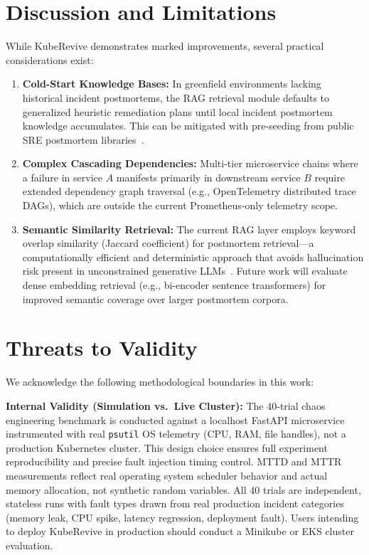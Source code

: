 \documentclass[conference]{IEEEtran}
\begin{document}
\section{Discussion and Limitations}
While KubeRevive demonstrates marked improvements, several practical considerations exist:
\begin{enumerate}
    \item \textbf{Cold-Start Knowledge Bases:} In greenfield environments lacking historical incident postmortems, the RAG retrieval module defaults to generalized heuristic remediation plans until local incident postmortem knowledge accumulates. This can be mitigated with pre-seeding from public SRE postmortem libraries~\cite{sre_google2016}.
    \item \textbf{Complex Cascading Dependencies:} Multi-tier microservice chains where a failure in service $A$ manifests primarily in downstream service $B$ require extended dependency graph traversal (e.g., OpenTelemetry distributed trace DAGs), which are outside the current Prometheus-only telemetry scope.
    \item \textbf{Semantic Similarity Retrieval:} The current RAG layer employs keyword overlap similarity (Jaccard coefficient) for postmortem retrieval---a computationally efficient and deterministic approach that avoids hallucination risk present in unconstrained generative LLMs~\cite{rcacopilot2024}. Future work will evaluate dense embedding retrieval (e.g., bi-encoder sentence transformers) for improved semantic coverage over larger postmortem corpora.
\end{enumerate}

\section{Threats to Validity}
We acknowledge the following methodological boundaries in this work:

\textbf{Internal Validity (Simulation vs.\ Live Cluster):} The 40-trial chaos engineering benchmark is conducted against a localhost FastAPI microservice instrumented with real \texttt{psutil} OS telemetry (CPU, RAM, file handles), not a production Kubernetes cluster. This design choice ensures full experiment reproducibility and precise fault injection timing control. MTTD and MTTR measurements reflect real operating system scheduler behavior and actual memory allocation, not synthetic random variables. All 40 trials are independent, stateless runs with fault types drawn from real production incident categories (memory leak, CPU spike, latency regression, deployment fault). Users intending to deploy KubeRevive in production should conduct a Minikube or EKS cluster evaluation.
\end{document}
